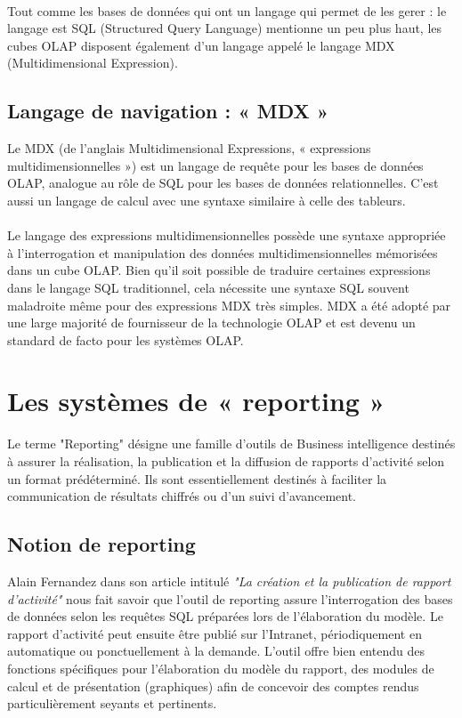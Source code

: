 \paragraph{}
Tout comme les bases de données qui ont un langage qui permet de les gerer : le langage est SQL (Structured Query Language) mentionne un peu plus haut, les cubes OLAP disposent également d’un langage appelé le langage MDX (Multidimensional Expression).


\subsection{Langage de navigation : « MDX »}
Le MDX (de l'anglais Multidimensional Expressions, « expressions multidimensionnelles ») est un langage de requête pour les bases de données OLAP, analogue au rôle de SQL pour les bases de données relationnelles. C'est aussi un langage de calcul avec une syntaxe similaire à celle des tableurs.
\paragraph{}
Le langage des expressions multidimensionnelles possède une syntaxe appropriée à l'interrogation et manipulation des données multidimensionnelles mémorisées dans un cube OLAP. Bien qu'il soit possible de traduire certaines expressions dans le langage SQL traditionnel, cela nécessite une syntaxe SQL souvent maladroite même pour des expressions MDX très simples. MDX a été adopté par une large majorité de fournisseur de la technologie OLAP et est devenu un standard de facto pour les systèmes OLAP.


\section{Les systèmes de « reporting »}
Le terme "Reporting" désigne une famille d'outils de Business intelligence destinés à assurer la réalisation, la publication et la diffusion de rapports d'activité selon un format prédéterminé. Ils sont essentiellement destinés à faciliter la communication de résultats chiffrés ou d'un suivi d'avancement.

\subsection{Notion de reporting}
Alain Fernandez dans son article intitulé \textit{"La création et la publication de rapport d'activité"} \cite{WEBSITE:4} nous fait savoir que l'outil de reporting assure l'interrogation des bases de données selon les requêtes SQL préparées lors de l'élaboration du modèle. Le rapport d'activité peut ensuite être publié sur l'Intranet, périodiquement en automatique ou ponctuellement à la demande. L'outil offre bien entendu des fonctions spécifiques pour l'élaboration du modèle du rapport, des modules de calcul et de présentation (graphiques) afin de concevoir des comptes rendus particulièrement seyants et pertinents.
